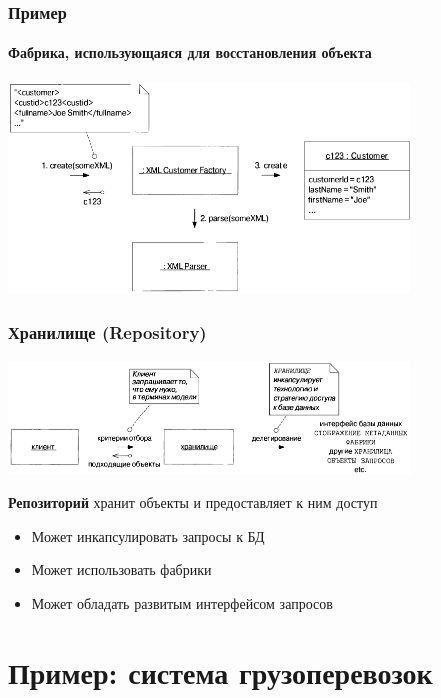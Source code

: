\documentclass[xetex,mathserif,serif]{beamer}
\begin{document}
	\begin{frame}
		\frametitle{Пример}
		\framesubtitle{Фабрика, использующаяся для восстановления объекта}
		\begin{center}
			\includegraphics[width=0.8\textwidth]{xmlFactory.png}
		\end{center}
	\end{frame}

	\begin{frame}
		\frametitle{Хранилище (Repository)}
		\begin{center}
			\includegraphics[width=0.8\textwidth]{repository.png}
		\end{center}
		\textbf{Репозиторий} хранит объекты и предоставляет к ним доступ
		\begin{itemize}
			\item Может инкапсулировать запросы к БД
			\item Может использовать фабрики
			\item Может обладать развитым интерфейсом запросов
		\end{itemize}
	\end{frame}

	\section{Пример: система грузоперевозок}
\end{document}
